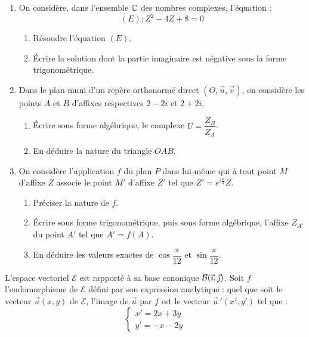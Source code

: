 \documentclass[11pt]{article}
\begin{document}


\begin{enumerate}
  \item On considère, dans l'ensemble $\mathbb{C}$ des nombres complexes, l'équation :
  \[ (E) : Z^2 - 4Z + 8 = 0 \]
  \begin{enumerate}[label=\alph*.]
    \item Résoudre l'équation $(E)$.
    \item Écrire la solution dont la partie imaginaire est négative sous la forme trigonométrique.
  \end{enumerate}
  \item Dans le plan muni d'un repère orthonormé direct $(O,\vec{u},\vec{v})$, on considère les points $A$ et $B$ d'affixes respectives $2 - 2i$ et $2 + 2i$.
  \begin{enumerate}[label=\alph*.]
    \item Écrire sous forme algébrique, le complexe $U = \dfrac{Z_B}{Z_A}$.
    \item En déduire la nature du triangle $OAB$.
  \end{enumerate}
  \item On considère l'application $f$ du plan $P$ dans lui-même qui à tout point $M$ d'affixe $Z$ associe le point $M'$ d'affixe $Z'$ tel que $Z' = e^{i\frac{\pi}{3}}Z$.
  \begin{enumerate}[label=\alph*.]
    \item Préciser la nature de $f$.
    \item Écrire sous forme trigonométrique, puis sous forme algébrique, l'affixe $Z_{A'}$ du point $A'$ tel que $A' = f(A)$.
    \item En déduire les valeurs exactes de $\cos\dfrac{\pi}{12}$ et $\sin\dfrac{\pi}{12}$.
  \end{enumerate}
\end{enumerate}


L'espace vectoriel $\mathcal{E}$ est rapporté à sa base canonique $\mathcal{B}(\vec{\imath},\vec{\jmath})$. Soit $f$ l'endomorphisme de $\mathcal{E}$ défini par son expression analytique : quel que soit le vecteur $\vec{u}(x, y)$ de $\mathcal{E}$, l'image de $\vec{u}$ par $f$ est le vecteur $\vec{u}\,'(x', y')$ tel que :
\[ \begin{cases} x' = 2x + 3y \\ y' = -x - 2y \end{cases} \]
\end{document}
